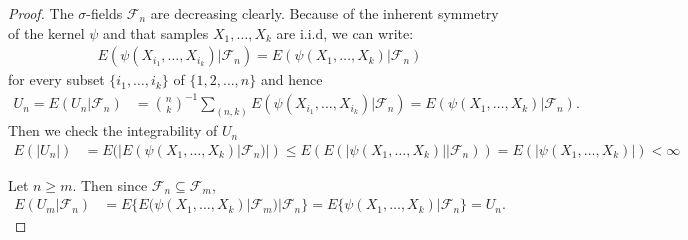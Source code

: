 \documentclass{article}
\theoremstyle{definition}
\numberwithin{Def}{section}
\begin{document}
\begin{proof}
The $\sigma$-fields $\mathcal{F}_n$ are decreasing clearly. Because of the inherent symmetry of the kernel $\psi$ and that samples $X_1, \dotsc, X_k$ are i.i.d, we can write:
\begin{align*}
    E(\psi (X_{i_1}, \dotsc, X_{i_k})|\mathcal{F}_n)=E(\psi (X_1, \dotsc, X_k)|\mathcal{F}_n)
\end{align*}
for every subset $\{i_1, \dotsc, i_k\}$ of $\{1,2,\dotsc,n\}$ and hence 
\begin{align*}
    U_n=E(U_n|\mathcal{F}_n)&={n\choose k}^{-1}\sum_{(n,k)}E(\psi(X_{i_1}, \dotsc,X_{i_k})|\mathcal{F}_n)
    =E(\psi(X_1,\dotsc,X_k)|\mathcal{F}_n).
\end{align*}
Then we check the integrability of $U_n$
\begin{align*}
E(|U_n|)&=E(|E(\psi(X_1,\dotsc,X_k)|\mathcal{F}_n)|)\le E(E(|\psi(X_1,\dotsc,X_k)||\mathcal{F}_n))
=E(|\psi(X_1,\dotsc, X_k)|)<\infty
\end{align*}

Let $n\ge m$. Then since $\mathcal{F}_n \subseteq \mathcal{F}_m$,
\begin{align*}
    E(U_m|\mathcal{F}_n)&=E\{E(\psi(X_1,\dotsc,X_k)|\mathcal{F}_m)|\mathcal{F}_n\}
    =E\{\psi(X_1,\dotsc,X_k)|\mathcal{F}_n\}
    =U_n.
\end{align*}
\end{proof}
\end{document}

